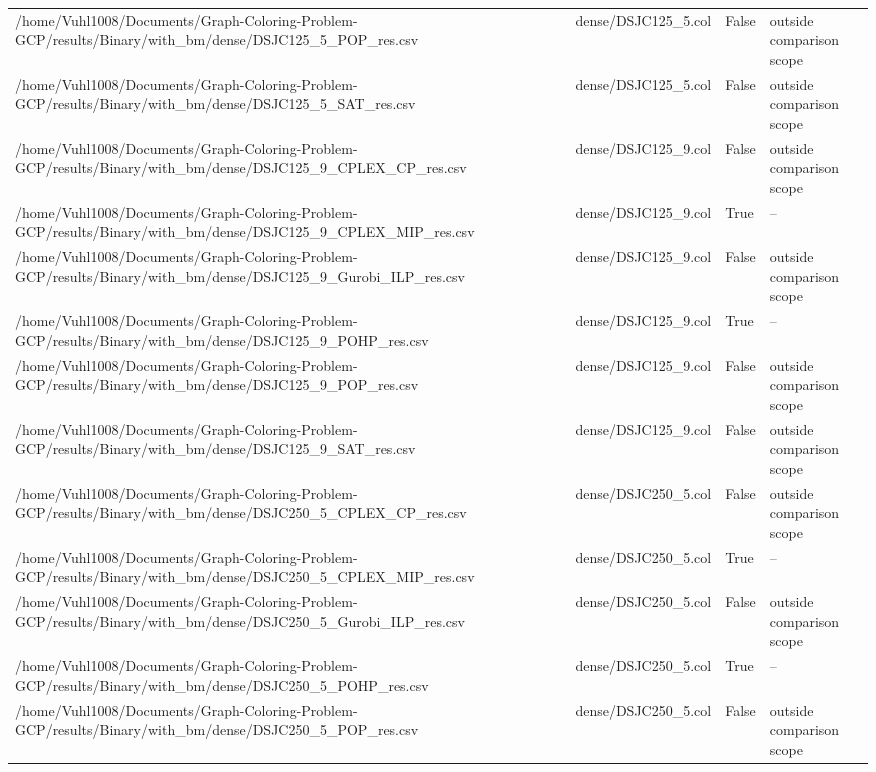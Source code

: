 \begin{table}[htbp]
\begin{tabular}{llll}
/home/Vuhl1008/Documents/Graph-Coloring-Problem-GCP/results/Binary/with\_bm/dense/DSJC125\_5\_POP\_res.csv & dense/DSJC125\_5.col & False & outside comparison scope \\
/home/Vuhl1008/Documents/Graph-Coloring-Problem-GCP/results/Binary/with\_bm/dense/DSJC125\_5\_SAT\_res.csv & dense/DSJC125\_5.col & False & outside comparison scope \\
/home/Vuhl1008/Documents/Graph-Coloring-Problem-GCP/results/Binary/with\_bm/dense/DSJC125\_9\_CPLEX\_CP\_res.csv & dense/DSJC125\_9.col & False & outside comparison scope \\
/home/Vuhl1008/Documents/Graph-Coloring-Problem-GCP/results/Binary/with\_bm/dense/DSJC125\_9\_CPLEX\_MIP\_res.csv & dense/DSJC125\_9.col & True & -- \\
/home/Vuhl1008/Documents/Graph-Coloring-Problem-GCP/results/Binary/with\_bm/dense/DSJC125\_9\_Gurobi\_ILP\_res.csv & dense/DSJC125\_9.col & False & outside comparison scope \\
/home/Vuhl1008/Documents/Graph-Coloring-Problem-GCP/results/Binary/with\_bm/dense/DSJC125\_9\_POHP\_res.csv & dense/DSJC125\_9.col & True & -- \\
/home/Vuhl1008/Documents/Graph-Coloring-Problem-GCP/results/Binary/with\_bm/dense/DSJC125\_9\_POP\_res.csv & dense/DSJC125\_9.col & False & outside comparison scope \\
/home/Vuhl1008/Documents/Graph-Coloring-Problem-GCP/results/Binary/with\_bm/dense/DSJC125\_9\_SAT\_res.csv & dense/DSJC125\_9.col & False & outside comparison scope \\
/home/Vuhl1008/Documents/Graph-Coloring-Problem-GCP/results/Binary/with\_bm/dense/DSJC250\_5\_CPLEX\_CP\_res.csv & dense/DSJC250\_5.col & False & outside comparison scope \\
/home/Vuhl1008/Documents/Graph-Coloring-Problem-GCP/results/Binary/with\_bm/dense/DSJC250\_5\_CPLEX\_MIP\_res.csv & dense/DSJC250\_5.col & True & -- \\
/home/Vuhl1008/Documents/Graph-Coloring-Problem-GCP/results/Binary/with\_bm/dense/DSJC250\_5\_Gurobi\_ILP\_res.csv & dense/DSJC250\_5.col & False & outside comparison scope \\
/home/Vuhl1008/Documents/Graph-Coloring-Problem-GCP/results/Binary/with\_bm/dense/DSJC250\_5\_POHP\_res.csv & dense/DSJC250\_5.col & True & -- \\
/home/Vuhl1008/Documents/Graph-Coloring-Problem-GCP/results/Binary/with\_bm/dense/DSJC250\_5\_POP\_res.csv & dense/DSJC250\_5.col & False & outside comparison scope \\

\end{tabular}
\end{table}

